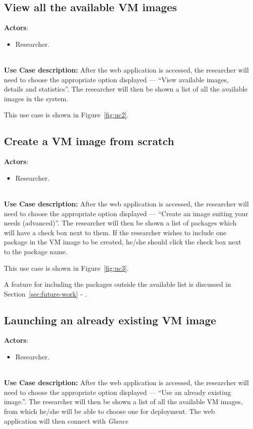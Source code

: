 \subsection{View all the available VM images}\label{subsec:uc2}

\textbf{Actors}:

\begin{itemize}
\item Researcher.
\end{itemize}\ \\
\textbf{Use Case description:} After the web application is accessed, the researcher will need to choose the appropriate option displayed --- ``View available images, details and statistics''. The researcher will then be shown a list of all the available images in the system.

This use case is shown in Figure~\ref{fig:uc2}.

\subsection{Create a VM image from scratch}\label{subsec:uc3}

\textbf{Actors}:

\begin{itemize}
\item Researcher.
\end{itemize}\ \\
\textbf{Use Case description:} After the web application is accessed, the researcher will need to choose the appropriate option displayed --- ``Create an image suiting your needs (advanced)''. The researcher will then be shown a list of packages which will have a check box next to them. If the researcher wishes to include one package in the VM image to be created, he/she should click the check box next to the package name. 

This use case is shown in Figure~\ref{fig:uc3}.

A feature for including the packages outside the available list is discussed in Section~\ref{sec:future-work} - .


\subsection{Launching an already existing VM image}\label{subsec:uc4}

\textbf{Actors}:

\begin{itemize}
\item Researcher.
\end{itemize}\ \\
\textbf{Use Case description:} After the web application is accessed, the researcher will need to choose the appropriate option displayed --- ``Use an already existing image.''. The researcher will then be shown a list of all the available VM images, from which he/she will be able to choose one for deployment. The web application will then connect with \textit{Glance}

